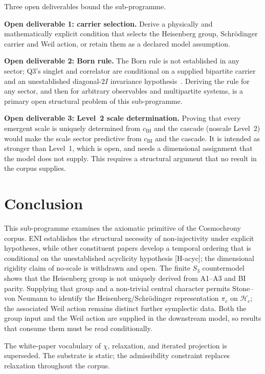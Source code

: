 \documentclass[11pt,a4paper]{article}
\theoremstyle{definition}
\newcommand{\cchi}{c_{\mathrm{BI}}}
\newcommand{\Hc}{\mathcal{H}_c}
\newcommand{\pic}{\pi_c}
\begin{document}
    Three open deliverables bound the sub-programme.

    \textbf{Open deliverable 1: carrier selection.}
    Derive a physically and mathematically explicit condition that selects the
    Heisenberg group, Schr\"odinger carrier and Weil action, or retain them as a declared model
    assumption.

    \textbf{Open deliverable 2: Born rule.}
    The Born rule is not established in any sector; Q3's singlet and correlator are conditional
    on a supplied bipartite carrier and an unestablished diagonal-$2I$ invariance
    hypothesis~\cite{Beau2026q3}.
    Deriving the rule for any sector, and then for arbitrary observables and multipartite systems,
    is a primary open structural problem of this sub-programme.

    \textbf{Open deliverable 3: Level~2 scale determination.}
    Proving that every emergent scale is uniquely determined from $\cchi$ and the cascade
    (noscale Level~2) would make the scale sector predictive from $\cchi$ and the cascade.
    It is intended as stronger than Level~1, which is open, and needs a dimensional assignment that the model
    does not supply.
    This requires a structural argument that no result in the corpus supplies.

  \section{Conclusion}
    \label{sec:conclusion}

    This sub-programme examines the axiomatic primitive of the Cosmochrony corpus.
    ENI establishes the structural necessity of non-injectivity under explicit hypotheses,
    while other constituent papers develop a temporal ordering that is conditional on the
    unestablished acyclicity hypothesis [H-acyc]; the dimensional rigidity claim of no-scale is withdrawn
    and open.
    The finite $S_3$ countermodel shows that the Heisenberg group is not uniquely derived from
    A1--A3 and BI parity.  Supplying that group and a non-trivial central character permits
    Stone--von Neumann to identify the Heisenberg/Schr\"odinger representation $\pic$ on $\Hc$;
    the associated Weil action remains distinct further symplectic data. Both the group input and
    the Weil action are supplied in the downstream model, so results that consume them must be read
    conditionally.

    The white-paper vocabulary of $\chi$, relaxation, and iterated projection is superseded.
    The substrate is static; the admissibility constraint replaces relaxation throughout the
    corpus.
\end{document}
